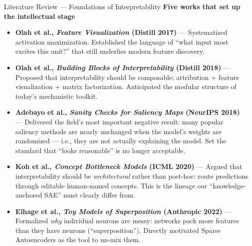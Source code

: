 \documentclass[aspectratio=169,11pt]{beamer}
\begin{document}
\begin{frame}{Literature Review --- Foundations of Interpretability}
    \textbf{Five works that set up the intellectual stage}

    \vspace{0.4em}
    \small
    \begin{itemize}
        \item \textbf{Olah et al., \textit{Feature Visualization} (Distill 2017)} --- Systematized activation maximization. Established the language of ``what input most excites this unit?'' that still underlies modern feature discovery.

        \item \textbf{Olah et al., \textit{Building Blocks of Interpretability} (Distill 2018)} --- Proposed that interpretability should be composable: attribution + feature visualization + matrix factorization. Anticipated the modular structure of today's mechanistic toolkit.

        \item \textbf{Adebayo et al., \textit{Sanity Checks for Saliency Maps} (NeurIPS 2018)} --- Delivered the field's most important negative result: many popular saliency methods are nearly unchanged when the model's weights are randomized --- i.e., they are not actually explaining the model. Set the standard that ``looks reasonable'' is no longer acceptable.

        \item \textbf{Koh et al., \textit{Concept Bottleneck Models} (ICML 2020)} --- Argued that interpretability should be \emph{architectural} rather than post-hoc: route predictions through editable human-named concepts. This is the lineage our ``knowledge-anchored SAE'' must clearly differ from.

        \item \textbf{Elhage et al., \textit{Toy Models of Superposition} (Anthropic 2022)} --- Formalized \emph{why} individual neurons are messy: networks pack more features than they have neurons (``superposition''). Directly motivated Sparse Autoencoders as the tool to un-mix them.
    \end{itemize}
\end{frame}
\end{document}
